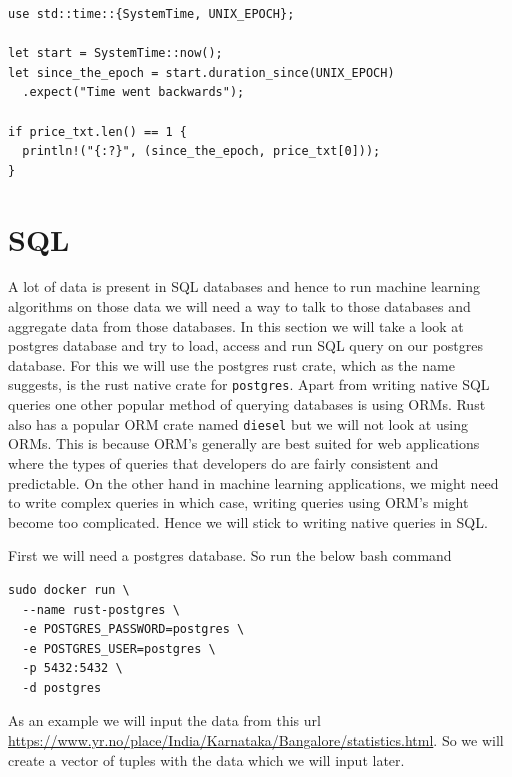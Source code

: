 \documentclass{book}
\begin{document}
\begin{lstlisting}[caption={chapter4\\/working\_with\_data\\/scraping\\/src\\/main\\.toml},basicstyle=\small]
use std::time::{SystemTime, UNIX_EPOCH};

let start = SystemTime::now();
let since_the_epoch = start.duration_since(UNIX_EPOCH)
  .expect("Time went backwards");

if price_txt.len() == 1 {
  println!("{:?}", (since_the_epoch, price_txt[0]));
}
\end{lstlisting}

\label{sec:scraping}

\section{SQL}%
A lot of data is present in SQL databases and hence to run machine learning algorithms on those data we will need a way to talk to those databases and aggregate data from those databases. In this section we will take a look at postgres database and try to load, access and run SQL query on our postgres database. For this we will use the postgres rust crate, which as the name suggests, is the rust native crate for \lstinline{postgres}. Apart from writing native SQL queries one other popular method of querying databases is using ORMs. Rust also has a popular ORM crate named \lstinline{diesel} but we will not look at using ORMs. This is because ORM's generally are best suited for web applications where the types of queries that developers do are fairly consistent and predictable. On the other hand in machine learning applications, we might need to write complex queries in which case, writing queries using ORM's might become too complicated. Hence we will stick to writing native queries in SQL.

First we will need a postgres database. So run the below bash command

\begin{lstlisting}[caption={bash},basicstyle=\small]
sudo docker run \
  --name rust-postgres \
  -e POSTGRES_PASSWORD=postgres \
  -e POSTGRES_USER=postgres \
  -p 5432:5432 \
  -d postgres
\end{lstlisting}

As an example we will input the data from this url \href{Bangalore Weather}{https://www.yr.no/place/India/Karnataka/Bangalore/statistics.html}. So we will create a vector of tuples with the data which we will input later.
\end{document}

